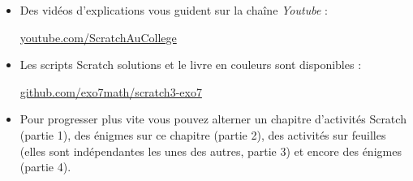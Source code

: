 \begin{minipage}{0.97\linewidth}
\begin{itemize}
  \item Des vidéos d'explications vous guident sur la chaîne \emph{Youtube} :

  \centerline{\href{https://www.youtube.com/c/ScratchAuCollege}{youtube.com/ScratchAuCollege}}
  
  \item Les scripts Scratch solutions et le livre en couleurs sont disponibles :

  \centerline{\href{https://github.com/exo7math/scratch3-exo7}{github.com/exo7math/scratch3-exo7}}

  \item  Pour progresser plus vite vous pouvez alterner un chapitre  d'activités Scratch (partie 1), des énigmes sur ce chapitre (partie 2), des activités sur feuilles (elles sont indépendantes les unes des autres, partie 3) et encore des énigmes (partie 4).
\end{itemize}
\end{minipage}


\cleardoublepage
\thispagestyle{empty}
\tableofcontents
